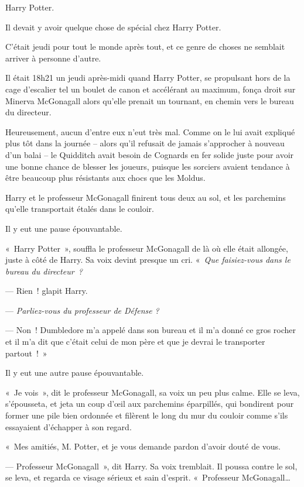 \later

Harry Potter.

Il devait y avoir quelque chose de spécial chez Harry Potter.

C'était jeudi pour tout le monde après tout, et ce genre de choses ne semblait arriver à personne d'autre.

Il était 18h21 un jeudi après-midi quand Harry Potter, se propulsant hors de la cage d'escalier tel un boulet de canon et accélérant au maximum, fonça droit sur Minerva McGonagall alors qu'elle prenait un tournant, en chemin vers le bureau du directeur.

Heureusement, aucun d'entre eux n'eut très mal.
Comme on le lui avait expliqué plus tôt dans la journée -- alors qu'il refusait de jamais s'approcher à nouveau d'un balai -- le Quidditch avait besoin de Cognards en fer solide juste pour avoir une bonne chance de blesser les joueurs, puisque les sorciers avaient tendance à être beaucoup plus résistants aux chocs que les Moldus.

Harry et le professeur McGonagall finirent tous deux au sol, et les parchemins qu'elle transportait étalés dans le couloir.

Il y eut une pause épouvantable.

«~Harry Potter~», souffla le professeur McGonagall de là où elle était allongée, juste à côté de Harry.
Sa voix devint presque un cri.
«~\emph{Que faisiez-vous dans le bureau du directeur~?}

--- Rien~! glapit Harry.

--- \emph{Parliez-vous du professeur de Défense} \emph{?}

--- Non~!
Dumbledore m'a appelé dans son bureau et il m'a donné ce gros rocher et il m'a dit que c'était celui de mon père et que je devrai le transporter partout~!~»

Il y eut une autre pause épouvantable.

«~Je vois~», dit le professeur McGonagall, sa voix un peu plus calme.
Elle se leva, s'épousseta, et jeta un coup d'œil aux parchemins éparpillés, qui bondirent pour former une pile bien ordonnée et filèrent le long du mur du couloir comme s'ils essayaient d'échapper à son regard.

«~Mes amitiés, M. Potter, et je vous demande pardon d'avoir douté de vous.

--- Professeur McGonagall~», dit Harry.
Sa voix tremblait.
Il poussa contre le sol, se leva, et regarda ce visage sérieux et sain d'esprit.
«~Professeur McGonagall…

